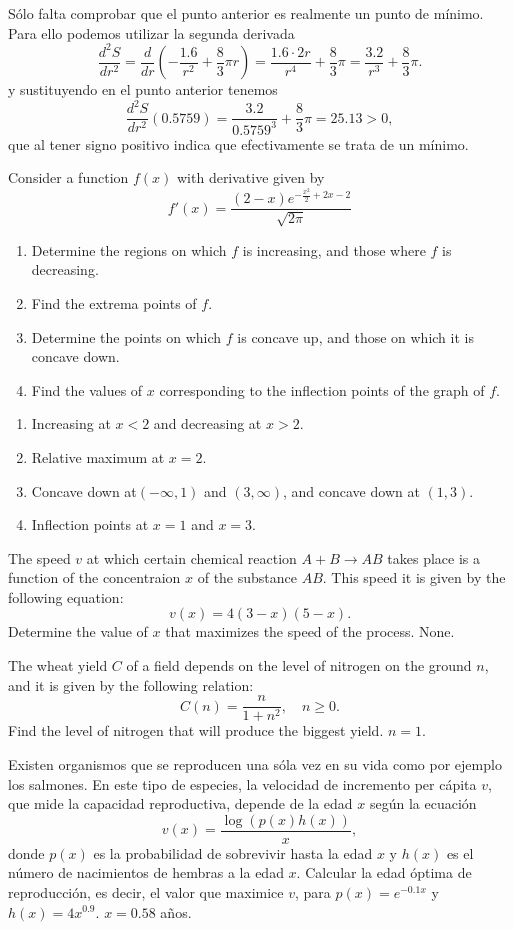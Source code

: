 {Sólo falta comprobar que el punto anterior es realmente un punto de mínimo. Para ello podemos utilizar la segunda derivada
\[
\frac{d^2S}{dr^2} = \frac{d}{dr}\left(-\frac{1.6}{r^2}+\frac{8}{3}\pi r\right) = \frac{1.6\cdot 2r}{r^4}+\frac{8}{3}\pi = \frac{3.2}{r^3}+\frac{8}{3}\pi.
\]
y sustituyendo en el punto anterior tenemos
\[
\frac{d^2S}{dr^2}(0.5759) =  \frac{3.2}{0.5759^3}+\frac{8}{3}\pi = 25.13 >0,
\]
que al tener signo positivo indica que efectivamente se trata de un mínimo.
}

{Consider a function $f(x)$ with derivative given by
\[
f'(x) = \frac{(2-x) e^{-\frac{x^2}{2}+2x-2}}{\sqrt{2\pi}}
\]
\begin{enumerate}
\item Determine the regions on which $f$ is increasing, and those where $f$ is decreasing.
\item Find the extrema points of $f$.
\item Determine the points on which $f$ is concave up, and those on which it is concave down.
\item Find the values of $x$ corresponding to the inflection points of the graph of $f$.
\end{enumerate}
}
{\begin{enumerate}
\item Increasing at $x<2$ and decreasing at $x>2$.
\item Relative maximum at $x=2$.
\item Concave down at$(-\infty,1)$ and $(3,\infty)$, and concave down at $(1,3)$.
\item Inflection points at $x=1$ and $x=3$.
\end{enumerate}
}
{
}


{The speed $v$ at which certain chemical reaction $A+B\rightarrow AB$ takes place is a function of the concentraion $x$ of the substance $AB$.
This speed it is given by the following equation:
\[
v(x) = 4(3-x)(5-x).
\]
Determine the value of $x$ that maximizes the speed of the process.
}
{None.
}
{
}


{The wheat yield $C$ of a field depends on the level of nitrogen on the ground $n$, and it is given by the following relation:
\[
C(n) = \frac{n}{1+n^2},\quad n\geq 0.
\]
Find the level of nitrogen that will produce the biggest yield.
}
{$n=1$.
}
{
}


{Existen organismos que se reproducen una sóla vez en su vida como por ejemplo los salmones.
En este tipo de especies, la velocidad de incremento per cápita $v$, que mide la capacidad reproductiva, depende de la edad $x$ según la ecuación
\[
v(x) = \frac{\log(p(x)h(x))}{x},
\]
donde $p(x)$ es la probabilidad de sobrevivir hasta la edad $x$ y $h(x)$ es el número de nacimientos de hembras a la edad $x$.
Calcular la edad óptima de reproducción, es decir, el valor que maximice $v$, para $p(x)=e^{-0.1x}$ y $h(x)=4x^{0.9}$.}
{$x=0.58$ años.
}
{
}


